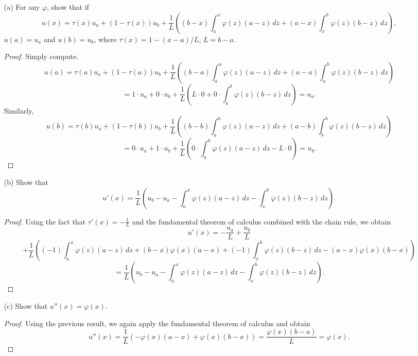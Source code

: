 \documentclass[10pt]{article}
\begin{document}

\begin{itemize}

\item[(a)] For any $ \varphi $, show that if $$
u(x) = \tau(x) u_a + (1 - \tau(x)) u_b + \frac{1}{L} \left( (b - x) \int_a^x \varphi(z) ( a - z ) \, dz +  (a - x) \int_x^b \varphi(z) ( b - z ) \, dz  \right),
$$ $ u(a) = u_a $ and $ u(b) = u_b $, where $ \tau(x) = 1 - (x-a)/L $, $ L = b - a $.

\begin{proof} Simply compute. $$
u(a) = \tau(a) u_a + (1 - \tau(a)) u_b + \frac{1}{L} \left( (b - a) \int_a^a \varphi(z) ( a - z ) \, dz +  (a - a) \int_a^b \varphi(z) ( b - z ) \, dz  \right)
$$ $$
= 1 \cdot u_a + 0 \cdot u_b + \frac{1}{L} \left( L \cdot 0 + 0 \cdot  \int_a^b \varphi(z) ( b - z ) \, dz \right) = u_a.
$$ Similarly, $$
u(b) = \tau(b) u_a + (1 - \tau(b)) u_b + \frac{1}{L} \left( (b - b) \int_a^b \varphi(z) ( a - z ) \, dz +  (a - b) \int_b^b \varphi(z) ( b - z ) \, dz  \right)
$$ $$
= 0 \cdot u_a + 1 \cdot u_b + \frac{1}{L} \left( 0 \cdot \int_a^b \varphi(z) ( a - z ) \, dz  - L \cdot 0 \right) = u_b.
$$
\end{proof}

\item[(b)] Show that $$
u'(x) = \frac{1}{L} \left( u_b - u_a - \int_a^x \varphi(z)(a - z) \, dz - \int_x^b  \varphi(z)(b - z) \, dz \right).
$$

\begin{proof} Using the fact that $ \tau'(x) = - \frac{1}{L} $ and the fundamental theorem of calculus combined with the chain rule, we obtain
$$
u'(x) = -\frac{u_a}{L} + \frac{u_b}{L} $$ $$+ \frac{1}{L} \left( 
(-1) \int_a^x \varphi(z) ( a - z ) \, dz + (b - x) \varphi(x) (a - x)
+ (-1) \int_x^b \varphi(z) ( b - z ) \, dz - (a - x) \varphi(x) (b - x)
 \right)
$$ $$
= \frac{1}{L}  \left( u_b - u_a - \int_a^x \varphi(z)(a - z) \, dz - \int_x^b  \varphi(z)(b - z) \, dz \right).
$$
\end{proof}

\item[(c)] Show that $ u''(x) = \varphi(x) $. 

\begin{proof}
Using the previous result, we again apply the fundamental theorem of calculus and obtain $$
u''(x) = \frac{1}{L} \left( - \varphi(x)(a - x) + \varphi(x)(b - x) \right) = \frac{\varphi(x) ( b - a )}{L} = \varphi(x).
$$
\end{proof}


\end{itemize}
\end{document}

